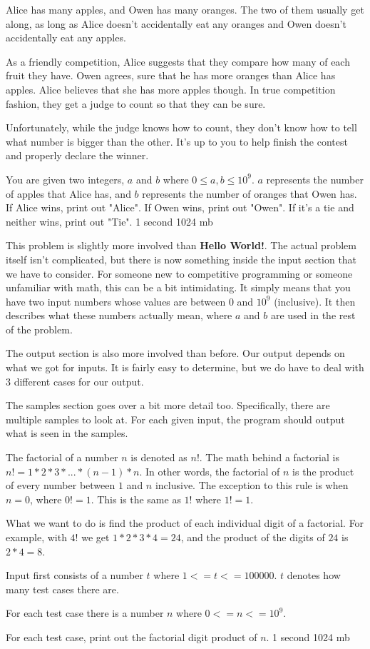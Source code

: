 {Alice has many apples, and Owen has many oranges. The two of them usually get along, as long as Alice doesn't accidentally eat any oranges and Owen doesn't accidentally eat any apples.

As a friendly competition, Alice suggests that they compare how many of each fruit they have. Owen agrees, sure that he has more oranges than Alice has apples. Alice believes that she has more apples though. In true competition fashion, they get a judge to count so that they can be sure.

Unfortunately, while the judge knows how to count, they don't know how to tell what number is bigger than the other. It's up to you to help finish the contest and properly declare the winner.}
{You are given two integers, $a$ and $b$ where $0 \leq a,b \leq 10^9$. $a$ represents the number of apples that Alice has, and $b$ represents the number of oranges that Owen has.}
{If Alice wins, print out "Alice". If Owen wins, print out "Owen". If it's a tie and neither wins, print out "Tie".}
{1 second}
{1024 mb}
{
}

\hrulefill

This problem is slightly more involved than \textbf{Hello World!}. The actual problem itself isn't complicated, but there is now something inside the input section that we have to consider. For someone new to competitive programming or someone unfamiliar with math, this can be a bit intimidating. It simply means that you have two input numbers whose values are between 0 and $10^9$ (inclusive). It then describes what these numbers actually mean, where $a$ and $b$ are used in the rest of the problem.

The output section is also more involved than before. Our output depends on what we got for inputs. It is fairly easy to determine, but we do have to deal with 3 different cases for our output.

The samples section goes over a bit more detail too. Specifically, there are multiple samples to look at. For each given input, the program should output what is seen in the samples.

\hrulefill

{The factorial of a number $n$ is denoted as $n!$. The math behind a factorial is $n! = 1 * 2 * 3 * ... * (n-1) * n$. In other words, the factorial of $n$ is the product of every number between $1$ and $n$ inclusive. The exception to this rule is when $n = 0$, where $0! = 1$. This is the same as $1!$ where $1! = 1$.

What we want to do is find the product of each individual digit of a factorial. For example, with $4!$ we get $1 * 2 * 3 * 4 = 24$, and the product of the digits of $24$ is $2 * 4 = 8$.}
{Input first consists of a number $t$ where $1 <= t <= 100000$. $t$ denotes how many test cases there are.

For each test case there is a number $n$ where $0 <= n <= 10^9$.}
{For each test case, print out the factorial digit product of $n$.}
{1 second}
{1024 mb}
{}

